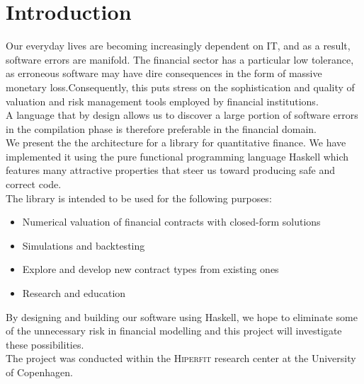 \chapter{Introduction}

Our everyday lives are becoming increasingly dependent on IT, and as a result,
software errors are manifold. The financial sector has a particular low 
tolerance, as erroneous software may have dire consequences in the form of
massive monetary loss.Consequently, this puts stress on the sophistication and 
quality of valuation and risk management tools employed by financial institutions.\\
A language that by design allows us to discover a large portion of software
errors in the compilation phase is therefore preferable in the financial domain.\\

We present the the architecture for a library for quantitative finance. We have
implemented it using the pure functional programming language Haskell which
features many attractive properties that steer us toward producing safe and
correct code.\\

The library is intended to be used for the following purposes:\\

\begin{itemize}
\item Numerical valuation of financial contracts with closed-form solutions
\item Simulations and backtesting
\item Explore and develop new contract types from existing ones
\item Research and education
\end{itemize}

By designing and building our software using Haskell, we hope to eliminate 
some of the unnecessary risk in financial modelling and this project
will investigate these possibilities.\\

The project was conducted within the \textsc{Hiperfit} research center at the
University of Copenhagen.\cite{Haskell}
